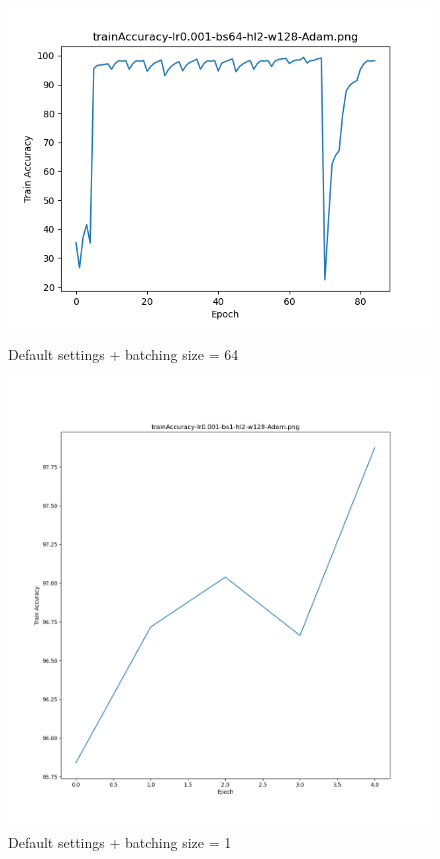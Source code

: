 \documentclass{article}[12pt]
\begin{document}
    \begin{figure}[H]
        \includegraphics[width=\linewidth]{testsResults/trainAccuracy/def.png}
        \caption{Default settings + batching size = 64}
        \endminipage\hfill
        \includegraphics[width=\linewidth]{testsResults/trainAccuracy/trainAccuracy1batch.png}
        \caption{Default settings + batching size = 1}
        \endminipage
    \end{figure}
\end{document}
